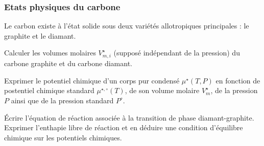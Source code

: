 \subsubsection{Etats physiques du carbone}
\label{subsubsection:relation_potentiel_chimique_CP-transition_phase}


\setcounter{equation}{0}
\setcounter{Q}{0}

Le carbon existe à l'état solide sous deux variétés allotropiques principales : le graphite et le diamant.

\Q Calculer les volumes molaires $V^\star_{m,i}$ (supposé indépendant de la pression) du carbone graphite et du carbone diamant.

\Q Exprimer le potentiel chimique d'un corps pur condensé $\mu^\star (T,P)$ en fonction de postentiel chimique standard $\mu^{\star, \circ}(T)$, de son volume molaire $V^\star_{m}$, de la pression $P$ ainsi que de la pression standard $P^\circ$.

\Q \'{E}crire l'équation de réaction associée à la transition de phase diamant-graphite. Exprimer l'enthapie libre de réaction et en déduire une condition d'équilibre chimique sur les potentiels chimiques.

